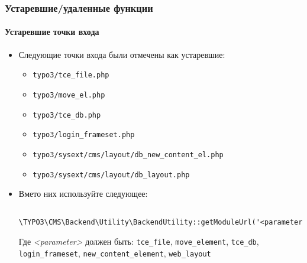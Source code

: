 \begin{frame}[fragile]
	\frametitle{Устаревшие/удаленные функции}
	\framesubtitle{Устаревшие точки входа}

	\begin{itemize}
		\item Следующие точки входа были отмечены как устаревшие:

			\begin{itemize}
				\item \texttt{typo3/tce\_file.php}
				\item \texttt{typo3/move\_el.php}
				\item \texttt{typo3/tce\_db.php}
				\item \texttt{typo3/login\_frameset.php}
				\item \texttt{typo3/sysext/cms/layout/db\_new\_content\_el.php}
				\item \texttt{typo3/sysext/cms/layout/db\_layout.php}
			\end{itemize}

		\item Вмето них используйте следующее:
			\begin{lstlisting}
				\TYPO3\CMS\Backend\Utility\BackendUtility::getModuleUrl('<parameter>')
			\end{lstlisting}

			Где \textit{<parameter>} должен быть:\newline
				\small
					\texttt{tce\_file}, \texttt{move\_element}, \texttt{tce\_db},
					\texttt{login\_frameset}, \texttt{new\_content\_element}, \texttt{web\_layout}
				\normalsize
	\end{itemize}

\end{frame}


